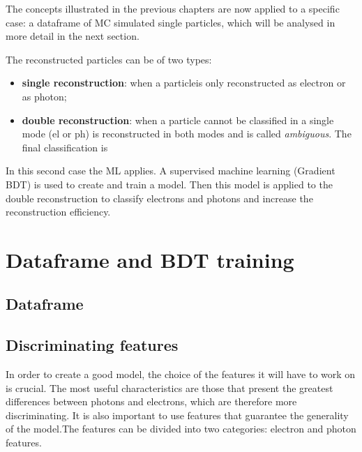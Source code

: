 The concepts illustrated in the previous chapters are now applied to a specific case: a dataframe of MC simulated single particles, which will be analysed in more detail in the next section.
		
		The reconstructed particles can be of two types:
		\begin{itemize}
			\item \textbf{single reconstruction}: when a particleis only reconstructed as electron or as photon;
			\item \textbf{double reconstruction}: when a particle cannot be classified in a single mode (el or ph) is reconstructed in both modes and is called \textit{ambiguous}. The final classification is
		\end{itemize}
		
		In this second case the ML applies. A supervised machine learning (Gradient BDT) is used to create and train a model. Then this model is applied to the double reconstruction to classify electrons and photons and increase the reconstruction efficiency.
		
		\section{Dataframe and BDT training}
			\subsection{Dataframe}
			
			\subsection{Discriminating features}
				In order to create a good model, the choice of the features it will have to work on is crucial. The most useful characteristics are those that present the greatest differences between photons and electrons, which are therefore more discriminating. It is also important to use features that guarantee the generality of the model.The features can be divided into two categories: electron and photon features.
